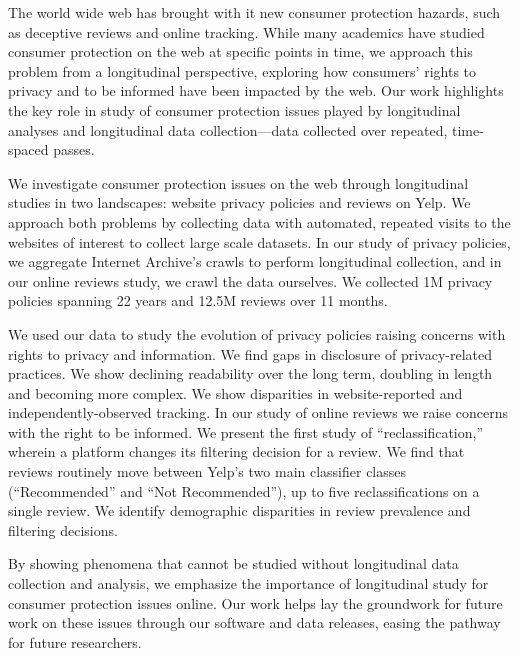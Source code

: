 

The world wide web has brought with it new consumer protection hazards, such as deceptive reviews and online tracking. While many academics have studied consumer protection on the web at specific points in time, we approach this problem from a longitudinal perspective, exploring how consumers' rights to privacy and to be informed have been impacted by the web. Our work highlights the key role in study of consumer protection issues played by longitudinal analyses and longitudinal data collection---data collected over repeated, time-spaced passes.

We investigate consumer protection issues on the web through longitudinal studies in two landscapes: website privacy policies and reviews on Yelp. We approach both problems by collecting data with automated, repeated visits to the websites of interest to collect large scale datasets. In our study of privacy policies, we aggregate Internet Archive's crawls to perform longitudinal collection, and in our online reviews study, we crawl the data ourselves. We collected 1M privacy policies spanning 22 years and 12.5M reviews over 11 months. 

We used our data to study the evolution of privacy policies raising concerns with rights to privacy and information. We find gaps in disclosure of privacy-related practices. We show declining readability over the long term, doubling in length and becoming more complex. We show disparities in website-reported and independently-observed tracking. In our study of online reviews we raise concerns with the right to be informed. We present the first study of ``reclassification,'' wherein a platform changes its filtering decision for a review. We find that reviews routinely move between Yelp's two main classifier classes (``Recommended'' and ``Not Recommended''), up to five reclassifications on a single review. We identify demographic disparities in review prevalence and filtering decisions.

By showing phenomena that cannot be studied without longitudinal data collection and analysis, we emphasize the importance of longitudinal study for consumer protection issues online. Our work helps lay the groundwork for future work on these issues through our software and data releases, easing the pathway for future researchers.